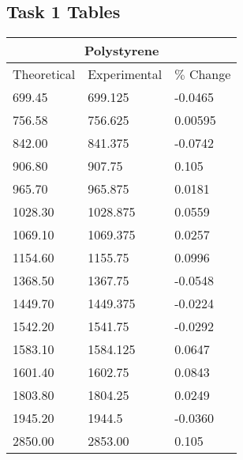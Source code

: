 \documentclass{article}
\begin{document}
\begin{appendices}

\section{Task 1 Tables}


\begin{table}[h!]
	\centering
	\begin{tabular}{|lll|}
	\hline
	\multicolumn{3}{|c|}{Polystyrene}                                       \\ \hline
	\multicolumn{1}{|c|}{Theoretical} & \multicolumn{1}{c|}{Experimental} & \multicolumn{1}{c|}{$\%$ Change} \\ \hline
	\multicolumn{1}{|l|}{699.45}  & \multicolumn{1}{l|}{699.125}  & -0.0465 \\ \hline
	\multicolumn{1}{|l|}{756.58}  & \multicolumn{1}{l|}{756.625}  & 0.00595 \\ \hline
	\multicolumn{1}{|l|}{842.00}  & \multicolumn{1}{l|}{841.375}  & -0.0742 \\ \hline
	\multicolumn{1}{|l|}{906.80}  & \multicolumn{1}{l|}{907.75}   & 0.105   \\ \hline
	\multicolumn{1}{|l|}{965.70}  & \multicolumn{1}{l|}{965.875}  & 0.0181  \\ \hline
	\multicolumn{1}{|l|}{1028.30} & \multicolumn{1}{l|}{1028.875} & 0.0559  \\ \hline
	\multicolumn{1}{|l|}{1069.10} & \multicolumn{1}{l|}{1069.375} & 0.0257  \\ \hline
	\multicolumn{1}{|l|}{1154.60} & \multicolumn{1}{l|}{1155.75}  & 0.0996  \\ \hline
	\multicolumn{1}{|l|}{1368.50} & \multicolumn{1}{l|}{1367.75}  & -0.0548 \\ \hline
	\multicolumn{1}{|l|}{1449.70} & \multicolumn{1}{l|}{1449.375} & -0.0224 \\ \hline
	\multicolumn{1}{|l|}{1542.20} & \multicolumn{1}{l|}{1541.75}  & -0.0292 \\ \hline
	\multicolumn{1}{|l|}{1583.10} & \multicolumn{1}{l|}{1584.125} & 0.0647  \\ \hline
	\multicolumn{1}{|l|}{1601.40} & \multicolumn{1}{l|}{1602.75}  & 0.0843  \\ \hline
	\multicolumn{1}{|l|}{1803.80} & \multicolumn{1}{l|}{1804.25}  & 0.0249  \\ \hline
	\multicolumn{1}{|l|}{1945.20} & \multicolumn{1}{l|}{1944.5}   & -0.0360 \\ \hline
	\multicolumn{1}{|l|}{2850.00} & \multicolumn{1}{l|}{2853.00}  & 0.105   \\ \hline

\end{tabular}
\end{table}
\end{appendices}
\end{document}
